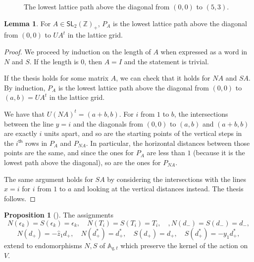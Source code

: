 \documentclass[reqno]{amsart}
\theoremstyle{plain}
\theoremstyle{definition}
\newtheorem{lemma}[theorem]{Lemma}
\newtheorem{proposition}[theorem]{Proposition}
\theoremstyle{remark}
\renewcommand{\th}{^\mathsf{th}}
\newcommand{\A}{\mathbb{A}}%
\newcommand{\z}{\widehat{z}}
\newcommand{\<}{\langle}
\renewcommand{\>}{\rangle}
\begin{document}
\begin{figure}
    \centering
    \caption{The lowest lattice path above the diagonal from $(0,0)$ to $(5,3)$.}
    \label{fig:lowest_path_53}
\end{figure}

\begin{lemma}
    \label{lem:lowest_path}
    For $A \in \mathsf{SL}_2(\mathbb{Z})_+$, $P_A$ is the lowest lattice path above the diagonal from $(0,0)$ to $U A^t$ in the lattice grid.
\end{lemma}

\begin{proof}
    We proceed by induction on the length of $A$ when expressed as a word in $N$ and $S$. If the length is $0$, then $A = I$ and the statement is trivial.

    If the thesis holds for some matrix $A$, we can check that it holds for $NA$ and $SA$. By induction, $P_A$ is the lowest lattice path above the diagonal from $(0,0)$ to $(a,b) = U A^t$ in the lattice grid.
    
    We have that $U (NA)^t = (a+b, b)$. For $i$ from $1$ to $b$, the intersections between the line $y=i$ and the diagonals from $(0,0)$ to $(a,b)$ and $(a+b,b)$ are exactly $i$ units apart, and so are the starting points of the vertical steps in the $i\th$ rows in $P_A$ and $P_{NA}$. In particular, the horizontal distances between those points are the same, and since the ones for $P_A$ are less than $1$ (because it is the lowest path above the diagonal), so are the ones for $P_{NA}$.

    The same argument holds for $SA$ by considering the intersections with the lines $x=i$ for $i$ from $1$ to $a$ and looking at the vertical distances instead. The thesis follows.
\end{proof}

\begin{proposition}[{\cite[Proposition~3.16]{Mellit2021Rational}}]
    \label{prop:north_south}
    The assignments
    \[ N(\epsilon_k) = S(\epsilon_k) = \epsilon_k, \quad N(T_i) = S(T_i) = T_i, \quad, N(d_-) = S(d_-) = d_-, \]
    \[ N(d_+) = - \z_1 d_+, \quad N(d_+^*) = d_+^*, \quad S(d_+) = d_+, \quad S(d_+^*) = -y_1 d_+^*, \]
    extend to endomorphisms $N, S$ of $\A_{q,t}$ which preserve the kernel of the action on $V$.
\end{proposition}
\end{document}

